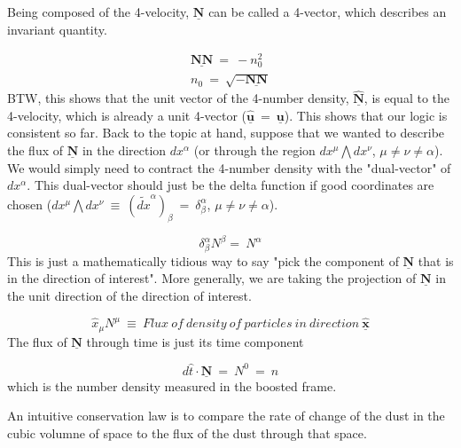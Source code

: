 \hskip 25pt Being composed of the 4-velocity, $\underline{\mathbf{N}}$ can be called a 4-vector, which describes an invariant quantity.

\begin{equation}
  \begin{gathered}
    \underline{\mathbf{NN}}\ =\ -n_0^2 \\
    n_0\ =\ \sqrt{-\underline{\mathbf{NN}}}
  \end{gathered}
\end{equation}
BTW, this shows that the unit vector of the 4-number density, $\widehat{\underline{\mathbf{N}}}$, is equal to the 4-velocity, which is already a unit 4-vector ($\hat{\underline{\mathbf{u}}}\ =\ \underline{\mathbf{u}}$).  This shows that our logic is consistent so far.  Back to the topic at hand, suppose that we wanted to describe the flux of $\underline{\mathbf{N}}$ in the direction $dx^{\alpha}$ (or through the region $dx^{\mu}\bigwedge dx^{\nu}$, $\mu\neq\nu\neq\alpha$).  We would simply need to contract the 4-number density with the "dual-vector" of $dx^{\alpha}$.  This dual-vector should just be the delta function if good coordinates are chosen ($dx^{\mu}\bigwedge dx^{\nu}\ \equiv\ (\tilde{dx}^{\alpha})_{\beta}\ =\ \delta^{\alpha}_{\beta}$, $\mu\neq\nu\neq\alpha$).

\begin{equation}
  \delta^{\alpha}_{\beta}N^{\beta} =\ N^{\alpha}
\end{equation}
This is just a mathematically tidious way to say "pick the component of $\underline{\mathbf{N}}$ that is in the direction of interest".  More generally, we are taking the projection of $\underline{\mathbf{N}}$ in the unit direction of the direction of interest.

\begin{equation}
  \hat{x}_{\mu}N^{\mu}\ \equiv\ \mathit{Flux\ of\ density\ of\ particles\ in\ direction}\ \hat{\underline{\mathbf{x}}}
\end{equation}
The flux of $\underline{\mathbf{N}}$ through time is just its time component

\begin{equation}
  d\hat{t}\cdot\underline{\mathbf{N}}\ =\ N^0\ =\ n
\end{equation}
which is the number density measured in the boosted frame.  

\hskip 25pt  An intuitive conservation law is to compare the rate of change of the dust in the cubic volumne of space to the flux of the dust through that space.

